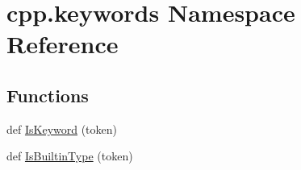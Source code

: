 \hypertarget{namespacecpp_1_1keywords}{}\section{cpp.\+keywords Namespace Reference}
\label{namespacecpp_1_1keywords}
\subsection*{Functions}
\begin{DoxyCompactItemize}
\item 
def \mbox{\hyperlink{namespacecpp_1_1keywords_ab9edc2cbd4a9d5ad58a1c0ad3281cbc9}{Is\+Keyword}} (token)
\item 
def \mbox{\hyperlink{namespacecpp_1_1keywords_ae0f7a581fef26ad1a71c59bd963ee285}{Is\+Builtin\+Type}} (token)
\end{DoxyCompactItemize}
